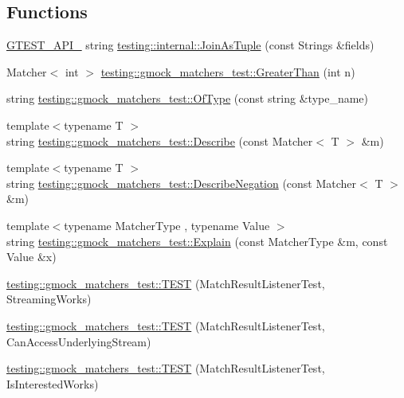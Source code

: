 \subsection*{Functions}
\begin{DoxyCompactItemize}
\item 
\hyperlink{gtest-port_8h_aa73be6f0ba4a7456180a94904ce17790}{G\+T\+E\+S\+T\+\_\+\+A\+P\+I\+\_\+} string \hyperlink{namespacetesting_1_1internal_a61d60981533cb0875bad9025e0d98b74}{testing\+::internal\+::\+Join\+As\+Tuple} (const Strings \&fields)
\item 
Matcher$<$ int $>$ \hyperlink{namespacetesting_1_1gmock__matchers__test_a8cf8614a7c9adc8fb00e8af04895f97c}{testing\+::gmock\+\_\+matchers\+\_\+test\+::\+Greater\+Than} (int n)
\item 
string \hyperlink{namespacetesting_1_1gmock__matchers__test_a5d48d2ef7ca374de369c5f0a30e32343}{testing\+::gmock\+\_\+matchers\+\_\+test\+::\+Of\+Type} (const string \&type\+\_\+name)
\item 
{\footnotesize template$<$typename T $>$ }\\string \hyperlink{namespacetesting_1_1gmock__matchers__test_a36ae44e4f6c8e9fe3fe9162132503717}{testing\+::gmock\+\_\+matchers\+\_\+test\+::\+Describe} (const Matcher$<$ T $>$ \&m)
\item 
{\footnotesize template$<$typename T $>$ }\\string \hyperlink{namespacetesting_1_1gmock__matchers__test_afbc8022da5a58aa467ec414ab3e90908}{testing\+::gmock\+\_\+matchers\+\_\+test\+::\+Describe\+Negation} (const Matcher$<$ T $>$ \&m)
\item 
{\footnotesize template$<$typename Matcher\+Type , typename Value $>$ }\\string \hyperlink{namespacetesting_1_1gmock__matchers__test_a6215aeb6213a03f4233924ef1c74d968}{testing\+::gmock\+\_\+matchers\+\_\+test\+::\+Explain} (const Matcher\+Type \&m, const Value \&x)
\item 
\hyperlink{namespacetesting_1_1gmock__matchers__test_a7bc21ec910c3861034d1336fecfcc260}{testing\+::gmock\+\_\+matchers\+\_\+test\+::\+T\+E\+ST} (Match\+Result\+Listener\+Test, Streaming\+Works)
\item 
\hyperlink{namespacetesting_1_1gmock__matchers__test_abc02b215e80c57464c83abdf297b9db7}{testing\+::gmock\+\_\+matchers\+\_\+test\+::\+T\+E\+ST} (Match\+Result\+Listener\+Test, Can\+Access\+Underlying\+Stream)
\item 
\hyperlink{namespacetesting_1_1gmock__matchers__test_ac7ee3826ca24c20fa2a8b388c72eedb2}{testing\+::gmock\+\_\+matchers\+\_\+test\+::\+T\+E\+ST} (Match\+Result\+Listener\+Test, Is\+Interested\+Works)

\end{DoxyCompactItemize}
